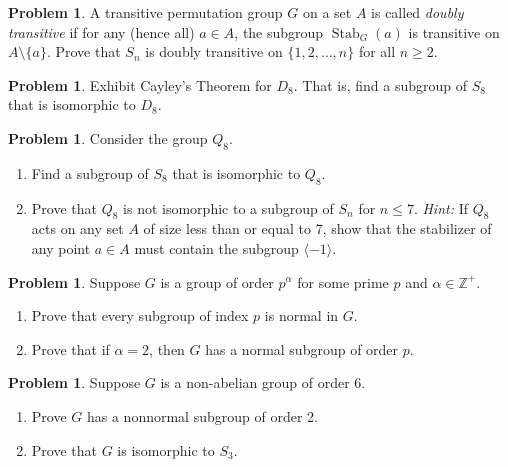 \documentclass[11pt]{scrartcl}
\theoremstyle{definition}
\newtheorem{problem}[theorem]{Problem}
\DeclareMathOperator{\Stab}{Stab}
\begin{document}
\begin{problem}
A transitive permutation group $G$ on a set $A$ is called \emph{doubly transitive} if for any (hence all) $a\in A$, the subgroup $\Stab_G(a)$ is transitive on $A\setminus\{a\}$. Prove that $S_n$ is doubly transitive on $\{1,2,\ldots,n\}$ for all $n\geq 2$.
\end{problem}

\begin{problem}
Exhibit Cayley's Theorem for $D_8$.  That is, find a subgroup of $S_8$ that is isomorphic to $D_8$.
\end{problem}

\begin{problem}
Consider the group $Q_8$.
\begin{enumerate}[label=\rm{(\alph*)}]
\item Find a subgroup of $S_8$ that is isomorphic to $Q_8$.
\item Prove that $Q_8$ is not isomorphic to a subgroup of $S_n$ for $n\leq 7$. \emph{Hint:} If $Q_8$ acts on any set $A$ of size less than or equal to 7, show that the stabilizer of any point $a\in A$ must contain the subgroup $\langle -1\rangle$.
\end{enumerate}
\end{problem}

\begin{problem}
Suppose $G$ is a group of order $p^{\alpha}$ for some prime $p$ and $\alpha\in\mathbb{Z}^+$.
\begin{enumerate}[label=\rm{(\alph*)}]
\item Prove that every subgroup of index $p$ is normal in $G$.
\item Prove that if $\alpha=2$, then $G$ has a normal subgroup of order $p$.
\end{enumerate}
\end{problem}

\begin{problem}
Suppose $G$ is a non-abelian group of order 6.
\begin{enumerate}[label=\rm{(\alph*)}]
\item Prove $G$ has a nonnormal subgroup of order 2.
\item Prove that $G$ is isomorphic to $S_3$.
\end{enumerate}
\end{problem}
\end{document}
